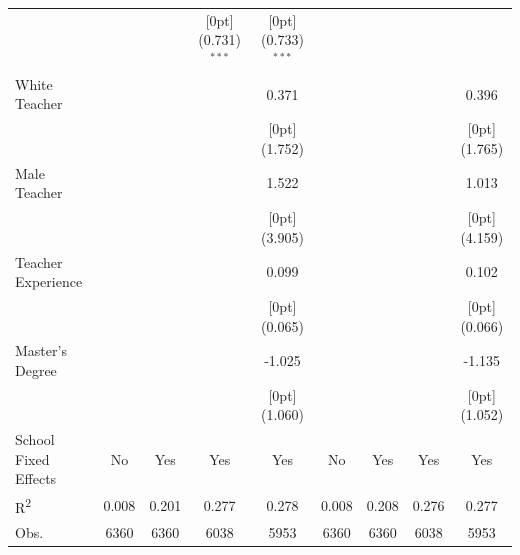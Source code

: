 \documentclass[a4paper,11pt]{article}
\begin{document}
\begin{table}[H]
\begin{tabular*}{\textwidth}{@{\extracolsep{\fill}}lcccccccc}
	&	&	&	\raisebox{.7ex}[0pt]{\scriptsize (0.731)$^{***}$} &	\raisebox{.7ex}[0pt]{\scriptsize (0.733)$^{***}$}  \\
	White Teacher &	&	&	&	0.371&	&	&	&	0.396 \\
	&	&	&	&	\raisebox{.7ex}[0pt]{\scriptsize (1.752)}	&	&	&	&	\raisebox{.7ex}[0pt]{\scriptsize (1.765)} \\
	Male Teacher &	&	&	&	1.522  &	&	&	&	1.013\\
	&	&	&	&	\raisebox{.7ex}[0pt]{\scriptsize (3.905)} 	&	&	&	&	\raisebox{.7ex}[0pt]{\scriptsize (4.159)} \\
	Teacher Experience &	&	&	&	0.099 &	&	&	&	0.102 \\
	&	&	&	&	\raisebox{.7ex}[0pt]{\scriptsize (0.065)} 	&	&	&	&	\raisebox{.7ex}[0pt]{\scriptsize (0.066)}\\
	Master's Degree &	&	&	&	-1.025 &	&	&	&	-1.135\\
	&	&	&	&	\raisebox{.7ex}[0pt]{\scriptsize (1.060)}&	&	&	&	\raisebox{.7ex}[0pt]{\scriptsize (1.052)} \\
	School Fixed Effects &	No  & Yes &	Yes & Yes &	No & Yes &	Yes & Yes \\
	R\textsuperscript{2} & 0.008 & 0.201 & 0.277 & 0.278 & 0.008 & 0.208 & 0.276 & 0.277 \\
	Obs. &	6360 &	6360 &	6038 &	5953  &	6360 &	6360 &	6038 &	5953\\
	\hline\hline				
\end{tabular*}
\end{table}
\end{document}
